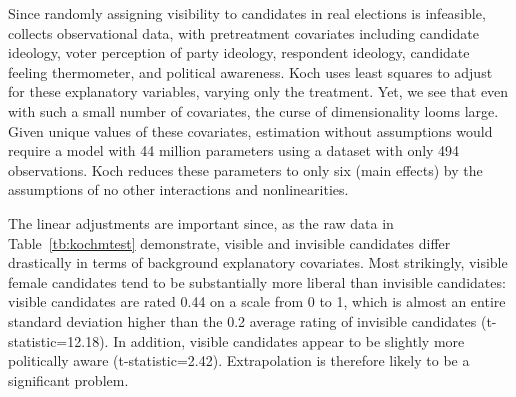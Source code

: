 \documentclass[11pt,titlepage]{article}
\begin{document}
Since randomly assigning visibility to candidates in real elections is
infeasible, \citet{Koch02} collects observational data, with
pretreatment covariates including candidate ideology, voter perception
of party ideology, respondent ideology, candidate feeling thermometer,
and political awareness.  Koch uses least squares to adjust for these
explanatory variables, varying only the treatment.  Yet, we see that
even with such a small number of covariates, the curse of
dimensionality looms large.  Given unique values of these covariates,
estimation without assumptions would require a model with 44 million
parameters using a dataset with only 494 observations.  Koch reduces
these parameters to only six (main effects) by the assumptions of no
other interactions and nonlinearities.

The linear adjustments are important since, as the raw data in
Table~\ref{tb:kochmtest} demonstrate, visible and invisible candidates
differ drastically in terms of background explanatory covariates.
Most strikingly, visible female candidates tend to be substantially
more liberal than invisible candidates: visible candidates are rated
0.44 on a scale from 0 to 1, which is almost an entire standard
deviation higher than the 0.2 average rating of invisible candidates
(t-statistic=12.18).  In addition, visible candidates appear to be
slightly more politically aware (t-statistic=2.42).  Extrapolation is
therefore likely to be a significant problem.
\end{document}
